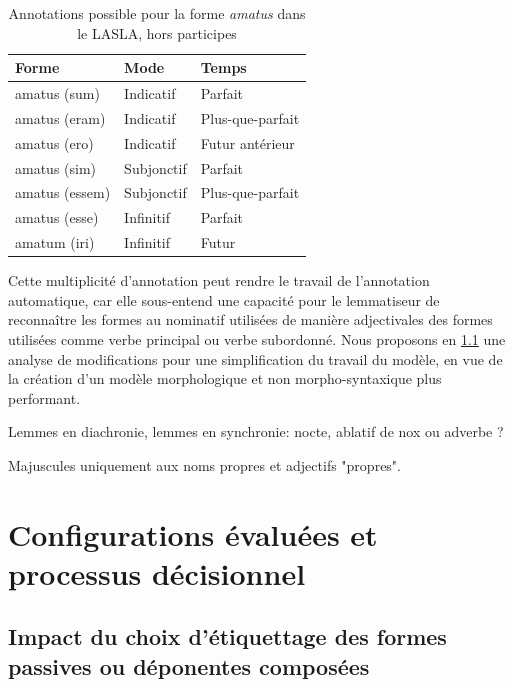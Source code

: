 
\newpara

\begin{table}[h]
\centering
\begin{tabular}{@{}lll@{}}
\toprule
Forme & Mode & Temps \\ \midrule
amatus (sum) & Indicatif & Parfait \\
amatus (eram) & Indicatif & Plus-que-parfait \\
amatus (ero) & Indicatif & Futur antérieur \\
amatus (sim) & Subjonctif & Parfait \\
amatus (essem) & Subjonctif & Plus-que-parfait \\
amatus (esse) & Infinitif & Parfait \\
amatum (iri) & Infinitif & Futur \\ \bottomrule
\end{tabular}
\caption{Annotations possible pour la forme \textit{amatus} dans le LASLA, hors participes}
\label{table:amatus_forms}
\end{table}

Cette multiplicité d'annotation peut rendre le travail de l'annotation automatique, car elle sous-entend une capacité pour le lemmatiseur de reconnaître les formes au nominatif utilisées de manière adjectivales des formes utilisées comme verbe principal ou verbe subordonné. Nous proposons en \ref{subsec:training:lasla-modification} une analyse de modifications pour une simplification du travail du modèle, en vue de la création d'un modèle morphologique et non morpho-syntaxique plus performant.

\newpara

Lemmes en diachronie, lemmes en synchronie: nocte, ablatif de nox ou adverbe ?

Majuscules uniquement aux noms propres et adjectifs "propres".

\section{Configurations évaluées et processus décisionnel}

\subsection{Impact du choix d'étiquettage des formes passives ou déponentes composées}
\label{subsec:training:lasla-modification}


